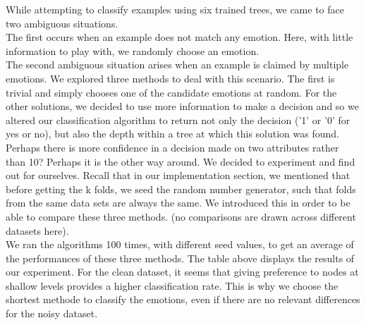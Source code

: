 While attempting to classify examples using six trained trees, we came to face two ambiguous situations.\\
The first occurs when an example does not match any emotion.
Here, with little information to play with, we randomly choose an emotion.\\
The second ambiguous situation arises when an example is claimed by multiple emotions.
We explored three methods to deal with this scenario.
The first is trivial and simply chooses one of the candidate emotions at random.
For the other solutions, we decided to use more information to make a decision and so we altered our classification algorithm
to return not only the decision ('1' or '0' for yes or no), but also the depth within a tree at which this solution was found.
Perhaps there is more confidence in a decision made on two attributes rather than 10? Perhaps it is the other way around.
We decided to experiment and find out for ourselves. Recall that in our implementation section, we mentioned that before getting
the k folds, we seed the random number generator, such that folds from the same data sets are always the same. We introduced this
in order to be able to compare these three methods. (no comparisons are drawn across different datasets here). \\



We ran the algorithms 100 times, with different seed values, to get an average of the performances of these three methods.
The table above displays the results of our experiment.
For the clean dataset, it seems that giving preference to nodes at shallow levels provides a higher classification rate.
This is why we choose the shortest methode to classify the emotions, even if there are no relevant differences for the noisy dataset.




